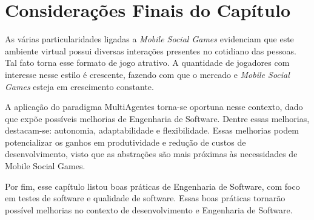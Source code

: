 \section{Considerações Finais do Capítulo}

As várias particularidades ligadas a \textit{Mobile Social Games} evidenciam
que este ambiente virtual possui diversas interações presentes no cotidiano das
pessoas. Tal fato torna esse formato de jogo atrativo. A quantidade de
jogadores com interesse nesse estilo é crescente, fazendo com que o mercado e
\textit{Mobile Social Games} esteja em crescimento constante.

A aplicação do paradigma MultiAgentes torna-se oportuna nesse contexto, dado que
expõe possíveis melhorias de Engenharia de Software. Dentre essas melhorias,
destacam-se: autonomia, adaptabilidade e flexibilidade. Essas melhorias podem
potencializar os ganhos em produtividade e redução de custos de
desenvolvimento, visto que as abstrações são mais próximas às necessidades de
Mobile Social Games.

Por fim, esse capítulo listou boas práticas de Engenharia de Software, com foco
em testes de software e qualidade de software. Essas boas práticas tornarão
possível melhorias no contexto de desenvolvimento e Engenharia de Software.
